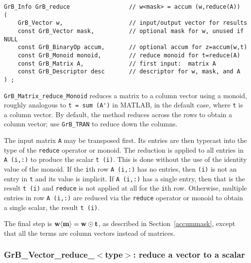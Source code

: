 \documentclass[12pt]{article}
\begin{document}
{\begin{mdframed}[userdefinedwidth=6in]
{\footnotesize
\begin{verbatim}
GrB_Info GrB_reduce                 // w<mask> = accum (w,reduce(A))
(
    GrB_Vector w,                   // input/output vector for results
    const GrB_Vector mask,          // optional mask for w, unused if NULL
    const GrB_BinaryOp accum,       // optional accum for z=accum(w,t)
    const GrB_Monoid monoid,        // reduce monoid for t=reduce(A)
    const GrB_Matrix A,             // first input:  matrix A
    const GrB_Descriptor desc       // descriptor for w, mask, and A
) ;
\end{verbatim} } \end{mdframed}

\verb'GrB_Matrix_reduce_Monoid'
reduces a matrix to a column vector using a monoid, roughly analogous
to \verb"t = sum (A')" in MATLAB, in the default case, where \verb't' is a
column vector.  By default, the method reduces across the rows to
obtain a column vector; use \verb'GrB_TRAN' to reduce down the columns.

The input matrix \verb'A' may be transposed first.  Its entries are then
typecast into the type of the \verb'reduce' operator or monoid.  The reduction
is applied to all entries in \verb'A (i,:)' to produce the scalar \verb't (i)'.
This is done without the use of the identity value of the monoid.  If the
\verb'i'th row \verb'A (i,:)' has no entries, then \verb'(i)' is not an entry
in \verb't' and its value is implicit.  If \verb'A (i,:)' has a single entry,
then that is the result \verb't (i)' and \verb'reduce' is not applied at all
for the \verb'i'th row.  Otherwise, multiple entries in row \verb'A (i,:)' are
reduced via the \verb'reduce' operator or monoid to obtain a single scalar,
the result \verb't (i)'.

The final step is ${\bf w \langle m \rangle  = w \odot t}$, as described
in Section~\ref{accummask}, except that all the
terms are column vectors instead of matrices.

\newpage
\subsubsection{{\sf GrB\_Vector\_reduce\_$<$type$>$:} reduce a vector to a scalar}
\label{reduce_vector_to_scalar}

}
\end{document}
